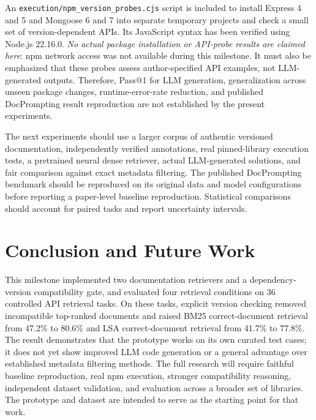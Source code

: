 \documentclass[conference]{IEEEtran}
\begin{document}
An \texttt{execution/npm\_version\_probes.cjs} script is included to install Express 4 and 5 and Mongoose 6 and 7 into separate temporary projects and check a small set of version-dependent APIs. Its JavaScript syntax has been verified using Node.js 22.16.0. \emph{No actual package installation or API-probe results are claimed here}: npm network access was not available during this milestone. It must also be emphasized that these probes assess author-specified API examples, not LLM-generated outputs. Therefore, Pass@1 for LLM generation, generalization across unseen package changes, runtime-error-rate reduction, and published DocPrompting result reproduction are not established by the present experiments.

The next experiments should use a larger corpus of authentic versioned documentation, independently verified annotations, real pinned-library execution tests, a pretrained neural dense retriever, actual LLM-generated solutions, and fair comparison against exact metadata filtering. The published DocPrompting benchmark should be reproduced on its original data and model configurations before reporting a paper-level baseline reproduction. Statistical comparisons should account for paired tasks and report uncertainty intervals.

\section{Conclusion and Future Work}
This milestone implemented two documentation retrievers and a dependency-version compatibility gate, and evaluated four retrieval conditions on 36 controlled API retrieval tasks. On these tasks, explicit version checking removed incompatible top-ranked documents and raised BM25 correct-document retrieval from 47.2\% to 80.6\% and LSA correct-document retrieval from 41.7\% to 77.8\%. The result demonstrates that the prototype works on its own curated test cases; it does not yet show improved LLM code generation or a general advantage over established metadata filtering methods. The full research will require faithful baseline reproduction, real npm execution, stronger compatibility reasoning, independent dataset validation, and evaluation across a broader set of libraries. The prototype and dataset are intended to serve as the starting point for that work.
\end{document}
